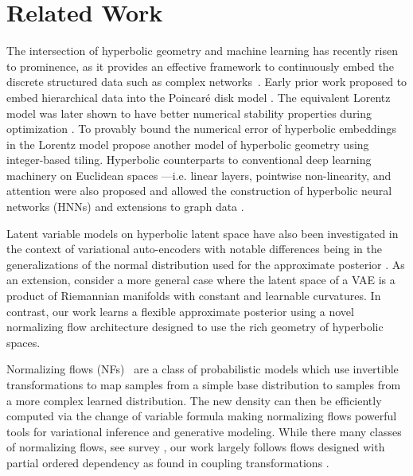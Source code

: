\section{Related Work}
The intersection of hyperbolic geometry and machine learning has recently risen to prominence, \cite{dhingra2018embedding,tay2018hyperbolic,law2019lorentzian,khrulkov2019hyperbolic} as it provides an effective framework to continuously embed the discrete structured data such as complex networks~\cite{krioukov2010hyperbolic}. Early prior work proposed to embed hierarchical data into the Poincar\'e disk model \cite{nickel2017poincare,chamberlain2017neural}.
The equivalent Lorentz model was later shown to have better numerical stability properties during optimization \cite{nickel2018learning}. 
To provably bound the numerical error of hyperbolic embeddings in the Lorentz model \cite{yu2019numerically} propose another model of hyperbolic geometry using integer-based tiling. 
Hyperbolic counterparts to conventional deep learning machinery on Euclidean spaces ---i.e. linear layers, pointwise non-linearity, and attention were also proposed and allowed the construction of hyperbolic neural networks (HNNs) \cite{gulcehre2018hyperbolic,ganea2018hyperbolic} and extensions to graph data \cite{liu2019graph,chami2019hyperbolic}.

Latent variable models on hyperbolic latent space have also been investigated in the context of variational auto-encoders with notable differences being in the generalizations of the normal distribution used for the approximate posterior \cite{nagano2019wrapped,mathieu2019continuous}. As an extension, \cite{skopek2019mixed} consider a more general case where the latent space of a VAE is a product of Riemannian manifolds with constant and learnable curvatures. In contrast, our work learns a flexible approximate posterior using a novel normalizing flow architecture designed to use the rich geometry of hyperbolic spaces.

Normalizing flows (NFs)~\cite{rezende2015variational,dinh2016density} are a class of probabilistic models which use invertible transformations to map samples from a simple base distribution to samples from a more complex learned distribution. The new density can then be efficiently computed via the change of variable formula making normalizing flows powerful tools for variational inference and generative modeling. While there many classes of normalizing flows, see survey \cite{papamakarios2019normalizing,kobyzev2019normalizing}, our work largely follows flows designed with partial ordered dependency as found in coupling transformations \cite{dinh2016density}. 

